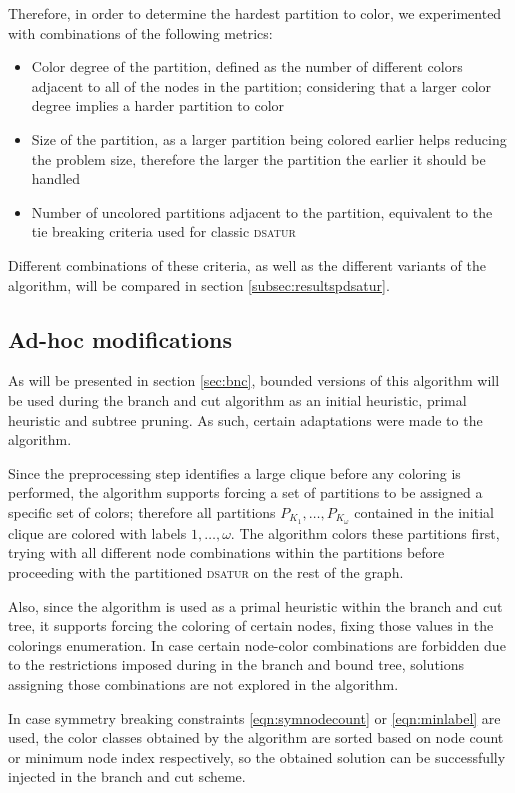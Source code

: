 Therefore, in order to determine the hardest partition to color, we experimented with combinations of the following metrics:
\begin{itemize}
	\item{Color degree of the partition, defined as the number of different colors adjacent to all of the nodes in the partition; considering that a larger color degree implies a harder partition to color}
	\item{Size of the partition, as a larger partition being colored earlier helps reducing the problem size, therefore the larger the partition the earlier it should be handled}
	\item{Number of uncolored partitions adjacent to the partition, equivalent to the tie breaking criteria used for classic \textsc{dsatur}} 
\end{itemize}

Different combinations of these criteria, as well as the different variants of the algorithm, will be compared in section \ref{subsec:resultspdsatur}.

\subsection{Ad-hoc modifications}

As will be presented in section \ref{sec:bnc}, bounded versions of this algorithm will be used during the branch and cut algorithm as an initial heuristic, primal heuristic and subtree pruning. As such, certain adaptations were made to the algorithm.

Since the preprocessing step identifies a large clique before any coloring is performed, the algorithm supports forcing a set of partitions to be assigned a specific set of colors; therefore all partitions $P_{K_1},\ldots,P_{K_\omega}$ contained in the initial clique are colored with labels $1,\ldots,\omega$. The algorithm colors these partitions first, trying with all different node combinations within the partitions before proceeding with the partitioned \textsc{dsatur} on the rest of the graph.

Also, since the algorithm is used as a primal heuristic within the branch and cut tree, it supports forcing the coloring of certain nodes, fixing those values in the colorings enumeration. In case certain node-color combinations are forbidden due to the restrictions imposed during in the branch and bound tree, solutions assigning those combinations are not explored in the algorithm.

In case symmetry breaking constraints \ref{eqn:symnodecount} or \ref{eqn:minlabel} are used, the color classes obtained by the algorithm are sorted based on node count or minimum node index respectively, so the obtained solution can be successfully injected in the branch and cut scheme.

